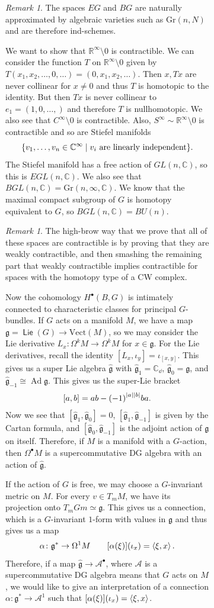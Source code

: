 \documentclass[leqno, openany]{memoir}
\theoremstyle{definition}
\theoremstyle{remark}
\newtheorem{rmk}[thm]{Remark}
\theoremstyle{plain}
\theoremstyle{definition}
\theoremstyle{remark}
\newcommand{\R}{\mathbb{R}}
\newcommand{\C}{\mathbb{C}}
\newcommand{\mc}[1]{\mathcal{#1}}
\newcommand{\mf}[1]{\mathfrak{#1}}
\newcommand{\mr}[1]{\mathrm{#1}}
\newcommand{\wh}[1]{\widehat{#1}}
\DeclareMathOperator{\Ad}{Ad}
\DeclareMathOperator{\Lie}{\mathsf{Lie}}
\begin{document}
\begin{figure}[H]
\begin{figure}[H]
\begin{rmk} The spaces $EG$ and $BG$ are naturally approximated by algebraic
varieties such as $\mr{Gr}(n, N)$ and are therefore ind-schemes.  \end{rmk}

We want to show that $\R^{\infty} \setminus 0$ is contractible. We can consider
the function $T$ on $\R^{\infty} \setminus 0$ given by $T(x_1, x_2, \ldots, 0,
\ldots) = (0, x_1, x_2, \ldots)$. Then $x, Tx$ are never collinear for $x \neq
0$ and thus $T$ is homotopic to the identity. But then $Tx$ is never collinear
to $e_1 = (1, 0, \ldots,)$ and therefore $T$ is nullhomotopic. We also see that
$C^{\infty} \setminus 0$ is contractible. Also, $S^{\infty} \sim \R^{\infty}
\setminus 0$ is contractible and so are Stiefel manifolds \[ \qty{v_1, \ldots,
v_n \in \C^{\infty} \mid v_i\ \text{are linearly independent}}. \] The Stiefel
manifold has a free action of $GL(n, \C)$, so this is $EGL(n, \C)$. We also see
that $BGL(n, \C) = \mr{Gr}(n, \infty, \C)$. We know that the maximal compact
subgroup of $G$ is homotopy equivalent to $G$, so $BGL(n, \C) = BU(n)$.

\begin{rmk} The high-brow way that we prove that all of these spaces are
    contractible is by proving that they are weakly contractible, and then
    smashing the remaining part that weakly contractible implies contractible
    for spaces with the homotopy type of a CW complex.  \end{rmk}

Now the cohomology $H^{\bullet}(B, G)$ is intimately connected to
characteristic classes for principal $G$-bundles. If $G$ acts on a manifold
$M$, we have a map $\mf{g} = \Lie(G) \to \mr{Vect}(M)$, so we may consider the
Lie derivative $L_x \colon \Omega^k M \to \Omega^k M$ for $x \in \mf{g}$. For
the Lie derivatives, recall the identity $[L_x, \iota_y] = \iota_{[x,y]}$. This
gives us a super Lie algebra $\wh{\mf{g}}$ with $\wh{\mf{g}}_1 = \C_{\dd}$,
$\wh{\mf{g}}_0 = \mf{g}$, and $\wh{\mf{g}}_{-1} \cong \Ad \mf{g}$. This gives
us the super-Lie bracket \[ [a,b] = ab - {(-1)}^{\abs{a} \abs{b}} ba. \] Now we
see that $[\wh{\mf{g}}_1, \wh{\mf{g}}_0] = 0$, $[\wh{\mf{g}}_1,
\wh{\mf{g}}_{-1}]$ is given by the Cartan formula, and $[\wh{\mf{g}}_0,
\wh{\mf{g}}_{-1}]$ is the adjoint action of $\mf{g}$ on itself. Therefore, if
$M$ is a manifold with a $G$-action, then $\Omega^{\bullet} M$ is a
supercommutative DG algebra with an action of $\wh{\mf{g}}$.

If the action of $G$ is free, we may choose a $G$-invariant metric on $M$. For
every $v \in T_m M$, we have its projection onto $T_m Gm \simeq \mf{g}$. This
gives us a connection, which is a $G$-invariant $1$-form with values in
$\mf{g}$ and thus gives us a map \[ \alpha \colon \mf{g}^* \to \Omega^1 M
\qquad [\alpha(\xi)] (\iota_x) = \ev{\xi, x}. \] Therefore, if a map
$\wh{\mf{g}} \to \mc{A}^{\bullet}$, where $\mc{A}$ is a supercommutative DG
algebra means that $G$ acts on $M$, we would like to give an interpretation of
a connection $\alpha \colon \mf{g}^* \to \mc{A}^1$ such that $[\alpha(\xi)]
(\iota_x) = \ev{\xi, x}$.


\end{figure}
\end{figure}
\end{document}
